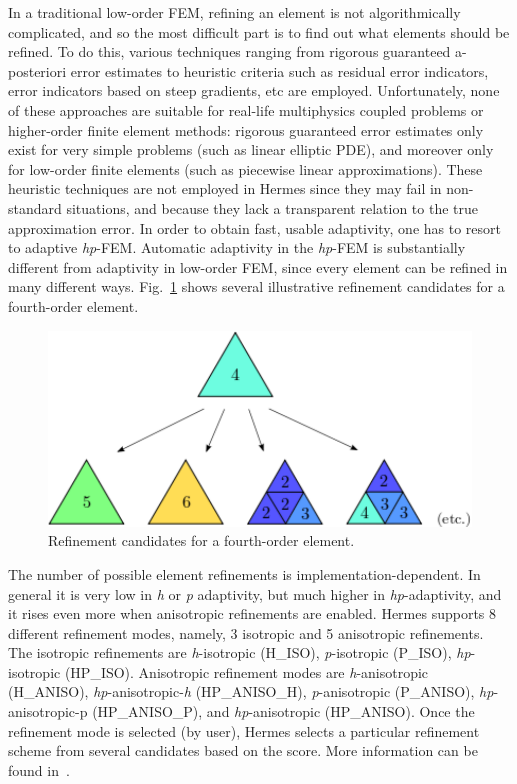 In a traditional low-order FEM, refining an element is not algorithmically complicated,
and so the most difficult part is to find out what elements should be refined. 
To do this, various techniques ranging from rigorous guaranteed a-posteriori 
error estimates to heuristic criteria such as residual error indicators, 
error indicators based on steep gradients, etc are employed. 
Unfortunately, none of these approaches are suitable for real-life 
multiphysics coupled problems or higher-order finite element methods: 
rigorous guaranteed error estimates only exist for very simple problems 
(such as linear elliptic PDE), and moreover only for low-order finite elements 
(such as piecewise linear approximations). These heuristic techniques 
are not employed in Hermes since they may fail 
in non-standard situations, and because they lack a 
transparent relation to the true approximation error.
In order to obtain fast, usable adaptivity, one has to resort to adaptive \emph{hp}-FEM.
Automatic adaptivity in the \emph{hp}-FEM is substantially different from adaptivity 
in low-order FEM, since every element can be refined in many different ways. 
Fig.~\ref{fig:refinements} shows several illustrative refinement candidates for a fourth-order element.
\begin{figure}
  \begin{centering}
  \includegraphics[width=0.5\columnwidth]{refinements}
  \caption{\label{fig:refinements} Refinement candidates for a fourth-order
  element.}
  \end{centering}
\end{figure}
The number of possible element refinements is implementation-dependent. 
In general it is very low in \emph{h} or \emph{p} adaptivity, 
but much higher in \emph{hp}-adaptivity, and it rises even more when 
anisotropic refinements are enabled.
Hermes supports 8 different refinement modes, namely,
3 isotropic and 5 anisotropic refinements. The isotropic refinements are
\emph{h}-isotropic (H\_ISO), \emph{p}-isotropic (P\_ISO), \emph{hp}-isotropic (HP\_ISO).
Anisotropic refinement modes are
\emph{h}-anisotropic (H\_ANISO),
\emph{hp}-anisotropic-\emph{h} (HP\_ANISO\_H), \emph{p}-anisotropic (P\_ANISO),
\emph{hp}-anisotropic-p (HP\_ANISO\_P), and \emph{hp}-anisotropic (HP\_ANISO).
Once the refinement mode is selected (by user), Hermes selects a particular
refinement scheme from several candidates based on the score. More information
can be found in~\cite{Hermes-project}.

